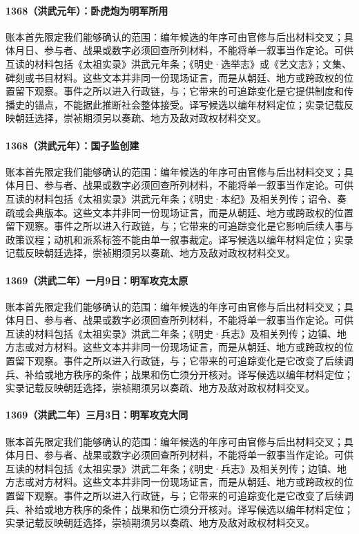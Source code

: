 \paragraph{1368（洪武元年）：卧虎炮为明军所用} 账本首先限定我们能够确认的范围：编年候选的年序可由官修与后出材料交叉；具体月日、参与者、战果或数字必须回查所列材料，不能将单一叙事当作定论。可供互读的材料包括《太祖实录》洪武元年条；《明史·选举志》或《艺文志》；文集、碑刻或书目材料。这些文本并非同一份现场证言，而是从朝廷、地方或跨政权的位置留下观察。事件之所以进入行政链，与；它带来的可追踪变化是它提供制度和传播史的锚点，不能据此推断社会整体接受。译写候选以编年材料定位；实录记载反映朝廷选择，崇祯期须另以奏疏、地方及敌对政权材料交叉。

\paragraph{1368（洪武元年）：国子监创建} 账本首先限定我们能够确认的范围：编年候选的年序可由官修与后出材料交叉；具体月日、参与者、战果或数字必须回查所列材料，不能将单一叙事当作定论。可供互读的材料包括《太祖实录》洪武元年条；《明史·本纪》及相关列传；诏令、奏疏或会典版本。这些文本并非同一份现场证言，而是从朝廷、地方或跨政权的位置留下观察。事件之所以进入行政链，与；它带来的可追踪变化是它影响后续人事与政策议程；动机和派系标签不能由单一叙事裁定。译写候选以编年材料定位；实录记载反映朝廷选择，崇祯期须另以奏疏、地方及敌对政权材料交叉。

\paragraph{1369（洪武二年）一月9日：明军攻克太原} 账本首先限定我们能够确认的范围：编年候选的年序可由官修与后出材料交叉；具体月日、参与者、战果或数字必须回查所列材料，不能将单一叙事当作定论。可供互读的材料包括《太祖实录》洪武二年条；《明史·兵志》及相关列传；边镇、地方志或对方材料。这些文本并非同一份现场证言，而是从朝廷、地方或跨政权的位置留下观察。事件之所以进入行政链，与；它带来的可追踪变化是它改变了后续调兵、补给或地方秩序的条件；战果和伤亡须分开核对。译写候选以编年材料定位；实录记载反映朝廷选择，崇祯期须另以奏疏、地方及敌对政权材料交叉。

\paragraph{1369（洪武二年）三月3日：明军攻克大同} 账本首先限定我们能够确认的范围：编年候选的年序可由官修与后出材料交叉；具体月日、参与者、战果或数字必须回查所列材料，不能将单一叙事当作定论。可供互读的材料包括《太祖实录》洪武二年条；《明史·兵志》及相关列传；边镇、地方志或对方材料。这些文本并非同一份现场证言，而是从朝廷、地方或跨政权的位置留下观察。事件之所以进入行政链，与；它带来的可追踪变化是它改变了后续调兵、补给或地方秩序的条件；战果和伤亡须分开核对。译写候选以编年材料定位；实录记载反映朝廷选择，崇祯期须另以奏疏、地方及敌对政权材料交叉。

